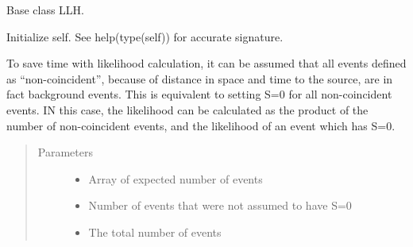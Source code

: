 \documentclass[letterpaper,10pt,english]{sphinxmanual}
\begin{document}
\begin{fulllineitems}
\label{\detokenize{index:flarestack.core.llh.LLH}}
Base class LLH.

\begin{fulllineitems}
\label{\detokenize{index:flarestack.core.llh.LLH.__init__}}
Initialize self.  See help(type(self)) for accurate signature.

\end{fulllineitems}


\begin{fulllineitems}
\label{\detokenize{index:flarestack.core.llh.LLH.assume_background}}
To save time with likelihood calculation, it can be assumed that
all events defined as “non-coincident”, because of distance in space
and time to the source, are in fact background events. This is
equivalent to setting S=0 for all non-coincident events. IN this
case, the likelihood can be calculated as the product of the number
of non-coincident events, and the likelihood of an event which has S=0.
\begin{quote}\begin{description}
\item[{Parameters}] \leavevmode\begin{itemize}
\item {} 
 \textendash{} Array of expected number of events

\item {} 
 \textendash{} Number of events that were not assumed to have S=0

\item {} 
 \textendash{} The total number of events


\end{itemize}
\end{description}
\end{quote}
\end{fulllineitems}
\end{fulllineitems}
\end{document}
